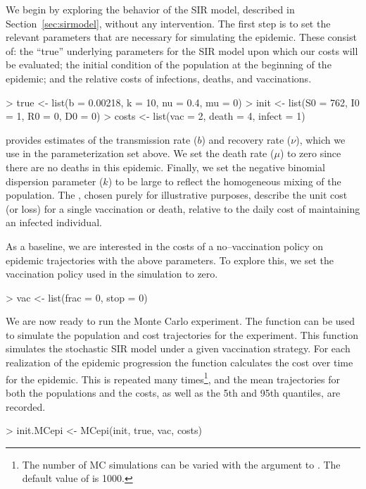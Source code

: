 \documentclass[shortnames,nojss]{jss}
\begin{document}
We begin by exploring the behavior of the SIR model, described in
Section~\ref{sec:sirmodel}, without any intervention. The first step
is to set the relevant parameters that are necessary for simulating
the epidemic.  These consist of: the ``true'' underlying parameters
for the SIR model upon which our costs will be evaluated; the initial
condition of the population at the beginning of the epidemic; and the
relative costs of infections, deaths, and vaccinations.
\begin{Schunk}
\begin{Sinput}
> true <- list(b = 0.00218, k = 10, nu = 0.4, mu = 0)
> init <- list(S0 = 762, I0 = 1, R0 = 0, D0 = 0)
> costs <- list(vac = 2, death = 4, infect = 1)
\end{Sinput}
\end{Schunk}
\citet{murray02} provides estimates of the transmission rate
($b$) and recovery rate ($\nu$), which we use in the 
 parameterization set above.  We set the death rate
($\mu$) to zero since there are no deaths in this epidemic.  Finally,
we set the negative binomial dispersion parameter ($k$) 
to be large to reflect the
homogeneous mixing of the population.  The , chosen purely for 
illustrative purposes,  describe the unit cost (or loss) 
for a single vaccination or death, relative to the
daily cost of maintaining an infected individual.

As a baseline, we are interested in the costs of a no--vaccination
policy on epidemic trajectories with the above parameters. To explore
this, we set the vaccination policy used in the simulation to zero.
\begin{Schunk}
\begin{Sinput}
> vac <- list(frac = 0, stop = 0)
\end{Sinput}
\end{Schunk}

We are now ready to run the Monte Carlo experiment. The function
 can be used to simulate the population and cost
trajectories for the experiment. This function simulates the
stochastic SIR model under a given vaccination strategy. For each
realization of the epidemic progression the function calculates the
cost over time for the epidemic. This is repeated many
times\footnote{The number of MC simulations can be varied with the
   argument to . The default value of
   is 1000.}, and the mean trajectories for both the
populations and the costs, as well as the 5th and 95th quantiles, are
recorded.
\begin{Schunk}
\begin{Sinput}
> init.MCepi <- MCepi(init, true, vac, costs)
\end{Sinput}
\end{Schunk}
\end{document}
